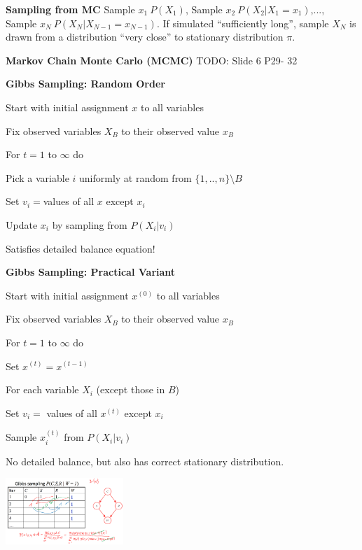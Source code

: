 \documentclass[a4paper, 11pt]{scrartcl}
\begin{document}
\begin{multicols*}{3}
\textbf{Sampling from MC}
Sample $x_1~P(X_1)$, Sample $x_2~P(X_2 | X_1=x_1)$,..., Sample $x_N~P(X_N | X_{N-1}=x_{N-1})$.
If simulated “sufficiently long”, sample $X_N$ is drawn from a distribution “very close” to stationary distribution $\pi$.

\textbf{Markov Chain Monte Carlo (MCMC)}
TODO: Slide 6 P29- 32

\textbf{Gibbs Sampling: Random Order}
\begin{compactitem}
\item Start with initial assignment $x$ to all variables
\item Fix observed variables $X_B$ to their observed value $x_B$
\item For $t=1$ to $\infty$ do
\begin{compactenum}
\item Pick a variable $i$ uniformly at random from $\{1,..,n\} \setminus B$
\item Set $v_i = $values of all $x$ except $x_i$
\item Update $x_i$ by sampling from $P(X_i | v_i)$
\end{compactenum}
\end{compactitem}
Satisfies detailed balance equation!

\textbf{Gibbs Sampling: Practical Variant}
\begin{compactitem}
 \item Start with initial assignment $x^{(0)}$ to all variables
 \item Fix observed variables $X_B$ to their observed value $x_B$
 \item For $t=1$ to $\infty$ do 
\begin{compactenum}
\item Set $x^{(t)} = x^{(t-1)}$
\item For each variable $X_i$ (except those in $B$) 
\item Set $v_i =$ values of all $x^{(t)}$ except $x_i$
\item Sample $x_i^{(t)}$ from $P(X_i | v_i)$
\end{compactenum}
\end{compactitem}
No detailed balance, but also has correct stationary distribution.

\includegraphics[height=2.5cm]{img/pai3.png}


\end{multicols*}
\end{document}

